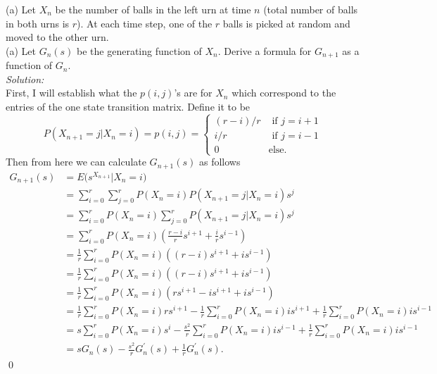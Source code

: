 \documentclass[10pt]{amsart}
\begin{document}
\newpage


 (a) Let $X_n$ be the number of balls in the left urn at time $n$ (total number of balls in both urns is $r$). At each time step, one of the $r$ balls is picked at random and moved to the other urn. \\

\noindent
(a) Let $G_n(s)$ be the generating function of $X_n$. Derive a formula for $G_{n+1}$ as a function of $G_n$. \\

\noindent
\textit{Solution:} \\
First, I will establish what the $p(i,j)$'s are for $X_n$ which correspond to the entries of the one state transition matrix.
Define it to be
$$
P(X_{n + 1} = j | X_n = i) = p(i,j) = 
\begin{cases}
(r - i)/r & \text{ if } j = i + 1 \\
i/r & \text{ if } j = i - 1 \\
0 & \text {else}.
\end{cases}
$$
Then from here we can calculate $G_{n+1}(s)$ as follows
\begin{align*}
G_{n+1}(s) &= E\Big( s^{X_{n + 1}} \Big| X_n = i \Big) \\
	&= \sum_{i=0}^r\sum_{j = 0}^r P(X_n = i)P(X_{n + 1} = j | X_n = i) s^{j} \\
	&= \sum_{i=0}^r P(X_n = i) \sum_{j = 0}^r P(X_{n + 1} = j | X_n = i) s^{j} \\
	&= \sum_{i=0}^r P(X_n = i) \left( \frac {r - i} r s^{i +1} + \frac i r s^{i - 1} \right) \\
	&= \frac 1 r \sum_{i=0}^r P(X_n = i) \left( (r - i) s^{i +1} + i s^{i - 1} \right) \\
	&= \frac 1 r \sum_{i=0}^r P(X_n = i) \left( (r - i) s^{i +1} + i s^{i - 1} \right) \\
	&= \frac 1 r \sum_{i=0}^r P(X_n = i) \left( rs^{i +1} - is^{i +1}  + i s^{i - 1} \right) \\
	&= \frac 1 r \sum_{i=0}^r P(X_n = i) rs^{i +1} - \frac 1 r \sum_{i=0}^r P(X_n = i) is^{i +1}  + \frac 1 r \sum_{i=0}^r P(X_n = i) i s^{i - 1} \\
	&= s\sum_{i=0}^r P(X_n = i) s^i - \frac {s^2} r \sum_{i=0}^r P(X_n = i) is^{i - 1}  + \frac 1 r \sum_{i=0}^r P(X_n = i) i s^{i - 1} \\
	&= sG_n(s) - \frac {s^2} r G_n^{\prime}(s)  + \frac 1 r G_n^{\prime}(s).
\end{align*}
\qed \\
\newpage
\end{document}
